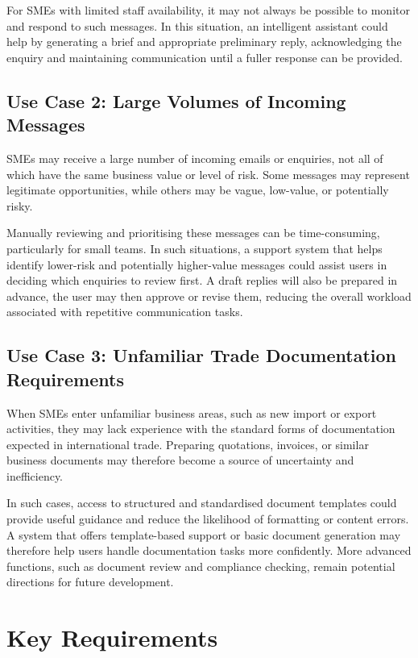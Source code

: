 \documentclass[12pt,a4paper]{report}
\begin{document}
For SMEs with limited staff availability, it may not always be possible to monitor and respond to such messages. In this situation, an intelligent assistant could help by generating a brief and appropriate preliminary reply, acknowledging the enquiry and maintaining communication until a fuller response can be provided.

\subsection*{Use Case 2: Large Volumes of Incoming Messages}

SMEs may receive a large number of incoming emails or enquiries, not all of which have the same business value or level of risk. Some messages may represent legitimate opportunities, while others may be vague, low-value, or potentially risky.

Manually reviewing and prioritising these messages can be time-consuming, particularly for small teams. In such situations, a support system that helps identify lower-risk and potentially higher-value messages could assist users in deciding which enquiries to review first. A draft replies will also be prepared in advance, the user may then approve or revise them, reducing the overall workload associated with repetitive communication tasks.

\subsection*{Use Case 3: Unfamiliar Trade Documentation Requirements}

When SMEs enter unfamiliar business areas, such as new import or export activities, they may lack experience with the standard forms of documentation expected in international trade. Preparing quotations, invoices, or similar business documents may therefore become a source of uncertainty and inefficiency.

In such cases, access to structured and standardised document templates could provide useful guidance and reduce the likelihood of formatting or content errors. A system that offers template-based support or basic document generation may therefore help users handle documentation tasks more confidently. More advanced functions, such as document review and compliance checking, remain potential directions for future development.

\section{Key Requirements}
\end{document}
